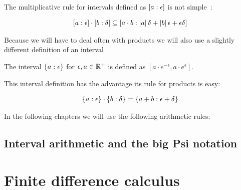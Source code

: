 The multiplicative rule for intervals defined as $\an{a}$ is not simple~\cite[p.~22]{kulla}:

\begin{align}
  \an[\epsilon]{a} \cdot \an[\delta]{b} \subseteq \an[\abs{a}\delta+\abs{b}\epsilon+\epsilon\delta]{a\cdot b}
\end{align}

Because we will have to deal often with products we will also use a slightly different definition of an interval 

\begin{definition}
  The interval $\ean{a}$ for $\epsilon,a\in\Rplus$ is defined as $\left[a\cdot e^{-\epsilon},a\cdot e^\epsilon\right]$.
\end{definition}

\noindent This interval definition has the advantage its rule for products is easy: 

\begin{align}
  \ean[\epsilon]{a}\cdot \ean[\delta]{b} = \ean[\epsilon+\delta]{a+b}
\end{align}

\noindent In the following chapters we will use the following arithmetic rules:

\begin{theorem}

\end{theorem}

\subsection{Interval arithmetic and the big Psi notation}

\section{Finite difference calculus}

